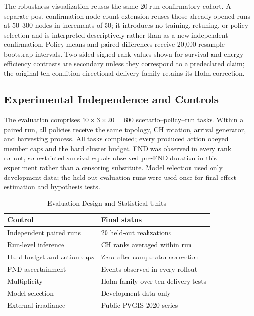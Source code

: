 \documentclass[journal]{IEEEtran}
\begin{document}
The robustness visualization reuses the same 20-run confirmatory cohort. A
separate post-confirmation node-count extension reuses those already-opened
runs at 50--300 nodes in increments of 50; it introduces no training, retuning,
or policy selection and is interpreted descriptively rather than as a new
independent confirmation. Policy means and paired differences receive
20,000-resample bootstrap intervals. Two-sided signed-rank values shown for
survival and energy-efficiency contrasts are secondary unless they correspond
to a predeclared claim; the original ten-condition directional delivery family
retains its Holm correction.

\subsection{Experimental Independence and Controls}

The evaluation comprises $10\times3\times20=600$ scenario--policy--run
tasks. Within a paired run, all policies receive the same topology, CH rotation,
arrival generator, and harvesting process. All tasks completed; every produced
action obeyed member caps and the hard cluster budget. FND was observed in
every rank rollout, so restricted survival equals observed pre-FND duration in
this experiment rather than a censoring substitute. Model selection used only
development data; the held-out evaluation runs were used once for final effect
estimation and hypothesis tests.

\begin{table}[t]
\centering
\caption{Evaluation Design and Statistical Units}
\label{tab:controls}
\scriptsize
\begin{tabular}{@{}ll@{}}
\toprule
Control & Final status \\
\midrule
Independent paired runs & 20 held-out realizations \\
Run-level inference & CH ranks averaged within run \\
Hard budget and action caps & Zero after comparator correction \\
FND ascertainment & Events observed in every rollout \\
Multiplicity & Holm family over ten delivery tests \\
Model selection & Development data only \\
External irradiance & Public PVGIS 2020 series \\
\bottomrule
\end{tabular}
\end{table}
\end{document}
